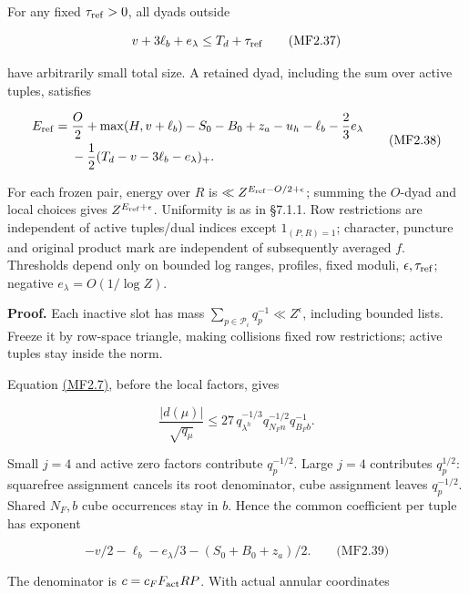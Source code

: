For any fixed \(\tau_{\rm ref}>0\), all dyads outside

\hypertarget{mf:eq:B2.37}{}

\label{mf:eq:B2.37}

\[
v+3\ell_b+e_\lambda\le T_d+\tau_{\rm ref}
\qquad\text{(MF2.37)}
\]

have arbitrarily small total size. A retained dyad, including the sum over active tuples, satisfies

\hypertarget{mf:eq:B2.38}{}

\label{mf:eq:B2.38}

\[
\begin{aligned}
E_{\rm ref}
={}&\frac O2+\max(H,v+\ell_b)-S_0-B_0+z_a-u_h-\ell_b-\frac23e_\lambda\\
&-\frac12(T_d-v-3\ell_b-e_\lambda)_+.
\end{aligned}
\qquad\text{(MF2.38)}
\]

For each frozen pair, energy over \(R\) is \(\ll Z^{E_{\rm ref}-O/2+\epsilon}\); summing the \(O\)-dyad and local choices gives \(Z^{E_{\rm ref}+\epsilon}\). Uniformity is as in §7.1.1. Row restrictions are independent of active tuples/dual indices except \(1_{(P,R)=1}\); character, puncture and original product mark are independent of subsequently averaged \(f\). Thresholds depend only on bounded log ranges, profiles, fixed moduli, \(\epsilon,\tau_{\rm ref}\); negative \(e_\lambda=O(1/\log Z)\).

\textbf{Proof.} Each inactive slot has mass \(\sum_{p\in\mathcal P_i}q_p^{-1}\ll Z^\epsilon\), including bounded lists. Freeze it by row-space triangle, making collisions fixed row restrictions; active tuples stay inside the norm.

Equation \protect\hyperlink{mf:eq:B2.7}{(MF2.7)}, before the local factors, gives

\[
\frac{|d(\mu)|}{\sqrt{q_\mu}}
\le27\,q_{\lambda^h}^{-1/3}q_{N_Fn}^{-1/2}q_{B_Fb}^{-1}.
\]

Small \(j=4\) and active zero factors contribute \(q_p^{-1/2}\). Large \(j=4\) contributes \(q_p^{1/2}\): squarefree assignment cancels its root denominator, cube assignment leaves \(q_p^{-1/2}\). Shared \(N_F,b\) cube occurrences stay in \(b\). Hence the common coefficient per tuple has exponent

\hypertarget{mf:eq:B2.39}{}

\label{mf:eq:B2.39}

\[
-v/2-\ell_b-e_\lambda/3-(S_0+B_0+z_a)/2.
\qquad\text{(MF2.39)}
\]

The denominator is \(c=c_FF_{\rm act}RP\). With actual annular coordinates

